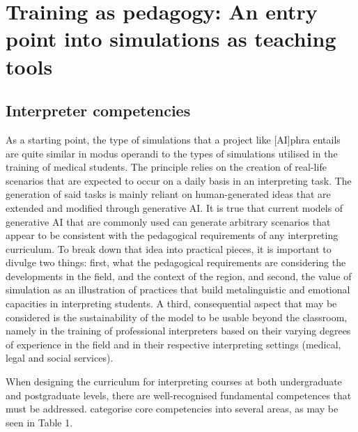 \documentclass[output=paper]{langscibook}
\begin{document}
\section{Training as pedagogy: An entry point into simulations as teaching tools}

\subsection{Interpreter competencies}

As a starting point, the type of simulations that a project like [AI]phra entails are quite similar in modus operandi to the types of simulations utilised in the training of medical students. The principle relies on the creation of real-life scenarios that are expected to occur on a daily basis in an interpreting task. The generation of said tasks is mainly reliant on human-generated ideas that are extended and modified through generative AI. It is true that current models of generative AI that are commonly used can generate arbitrary scenarios that appear to be consistent with the pedagogical requirements of any interpreting curriculum. To break down that idea into practical pieces, it is important to divulge two things: first, what the pedagogical requirements are considering the developments in the field, and the context of the region, and second, the value of simulation as an illustration of practices that build metalinguistic and emotional capacities in interpreting students. A third, consequential aspect that may be considered is the sustainability of the model to be usable beyond the classroom, namely in the training of professional interpreters based on their varying degrees of experience in the field and in their respective interpreting settings (medical, legal and social services). 

When designing the curriculum for interpreting courses at both undergraduate and postgraduate levels, there are well-recognised fundamental competences that must be addressed. \citet[25]{phelan2020ethics} categorise core competencies into several areas, as may be seen in Table 1.
\end{document}
